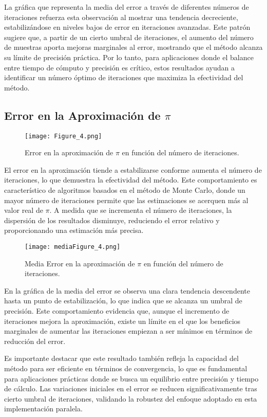 \documentclass[conference, a4paper]{IEEEtran}
\begin{document}
La gráfica que representa la media del error a través de diferentes números de iteraciones refuerza esta observación al mostrar una tendencia decreciente, estabilizándose en niveles bajos de error en iteraciones avanzadas. Este patrón sugiere que, a partir de un cierto umbral de iteraciones, el aumento del número de muestras aporta mejoras marginales al error, mostrando que el método alcanza su límite de precisión práctica. Por lo tanto, para aplicaciones donde el balance entre tiempo de cómputo y precisión es crítico, estos resultados ayudan a identificar un número óptimo de iteraciones que maximiza la efectividad del método.


\subsection{Error en la Aproximación de \(\pi\)}
\begin{figure}[h!]
    \centering
    \texttt{[image: Figure\_4.png]}
    \caption{Error en la aproximación de \(\pi\) en función del número de iteraciones.}
    \label{fig:error}
\end{figure}

El error en la aproximación tiende a estabilizarse conforme aumenta el número de iteraciones, lo que demuestra la efectividad del método. Este comportamiento es característico de algoritmos basados en el método de Monte Carlo, donde un mayor número de iteraciones permite que las estimaciones se acerquen más al valor real de \(\pi\). A medida que se incrementa el número de iteraciones, la dispersión de los resultados disminuye, reduciendo el error relativo y proporcionando una estimación más precisa.

\begin{figure}[h!]
    \centering
    \texttt{[image: mediaFigure\_4.png]}
    \caption{Media Error en la aproximación de \(\pi\) en función del número de iteraciones.}
    \label{fig:error}
\end{figure}

En la gráfica de la media del error se observa una clara tendencia descendente hasta un punto de estabilización, lo que indica que se alcanza un umbral de precisión. Este comportamiento evidencia que, aunque el incremento de iteraciones mejora la aproximación, existe un límite en el que los beneficios marginales de aumentar las iteraciones empiezan a ser mínimos en términos de reducción del error.

Es importante destacar que este resultado también refleja la capacidad del método para ser eficiente en términos de convergencia, lo que es fundamental para aplicaciones prácticas donde se busca un equilibrio entre precisión y tiempo de cálculo. Las variaciones iniciales en el error se reducen significativamente tras cierto umbral de iteraciones, validando la robustez del enfoque adoptado en esta implementación paralela.
\end{document}
